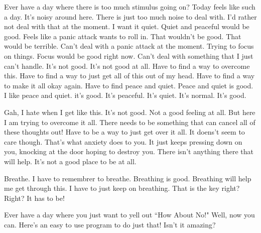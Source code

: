 Ever have a day where there is too much stimulus going on? Today feels like such
a day. It's noisy around here. There is just too much noise to deal with. I'd
rather not deal with that at the moment. I want it quiet. Quiet and peaceful
would be good. Feels like a panic attack wants to roll in. That wouldn't be
good. That would be terrible. Can't deal with a panic attack at the moment.
Trying to focus on things. Focus would be good right now. Can't deal with
something that I just can't handle. It's not good. It's not good at all. Have to
find a way to overcome this. Have to find a way to just get all of this out of
my head. Have to find a way to make it all okay again. Have to find peace and
quiet. Peace and quiet is good. I like peace and quiet. it's good. It's
peaceful. It's quiet. It's normal. It's good.

Gah, I hate when I get like this. It's not good. Not a good feeling at all. But
here I am trying to overcome it all. There needs to be something that can cancel
all of these thoughts out! Have to be a way to just get over it all. It doens't
seem to care though. That's what anxiety does to you. It just keeps pressing
down on you, knocking at the door hoping to destroy you. There isn't anything
there that will help. It's not a good place to be at all.

Breathe. I have to remembrer to breathe. Breathing is good. Breathing will help
me get through this. I have to just keep on breathing. That is the key right?
Right? It has to be!

Ever have a day where you just want to yell out ``How About No!" Well, now you
can. Here's an easy to use program to do just that! Isn't it amazing?


